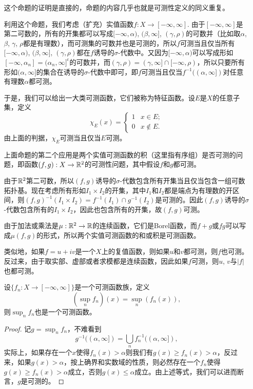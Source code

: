 这个命题的证明是直接的，命题的内容几乎也就是可测性定义的同义重复。

利用这个命题，我们考虑（扩充）实值函数$f:X\to [-\infty,\infty]$. 由于$[-\infty,\infty]$是第二可数的，所有的开集都可以写成$[-\infty,\alpha)$, $(\beta,\infty]$, $(\gamma,\rho)$的可数并（比如取$\alpha$, $\beta$, $\gamma$, $\rho$都是有理数），而可测集的可数并也是可测的，所以$f$可测当且仅当所有$[-\infty,\alpha)$, $(\beta,\infty]$, $(\gamma,\rho)$都在$f$诱导的$\sigma$-代数中。又因为$[-\infty,\alpha)$可以写成形如$[-\infty,\alpha_n]=(\alpha_n,\infty]^\text{c}$的可数并，而$(\gamma,\rho)=(\gamma,\infty]\cap [-\infty,\rho)$，所以只要所有形如$(\alpha,\infty]$的集合在诱导的$\sigma$-代数中即可，即$f$可测当且仅当$f^{-1}((\alpha,\infty])$对任意有理数$\alpha$都可测。

于是，我们可以给出一大类可测函数，它们被称为特征函数。设$E$是$X$的任意子集，定义
\[
	\chi_E(x)=\begin{cases}
	1&x\in E;\\
	0&x\not\in E.
	\end{cases}
\]
由上面的判据，$\chi_E$可测当且仅当$E$可测。

上面命题的第二个应用是两个实值可测函数的积（这里指有序组）是否可测的问题，即函数$(f,g):X\to \mathbb{R}^2$的可测性问题，其中假设$f$和$g$都可测。

由于$\mathbb{R}^2$第二可数，所以$(f,g)$诱导的$\sigma$-代数包含所有开集当且仅当包含一组可数拓扑基。现在考虑所有形如$I_1\times I_2$的开集，其中$I_1$和$I_2$都是端点为有理数的开区间，则$(f,g)^{-1}(I_1\times I_2)=f^{-1}(I_1)\cap g^{-1}(I_2)$是可测的。因此$(f,g)$诱导的$\sigma$-代数包含所有的$I_1\times I_2$，因此也包含所有的开集，故$(f,g)$可测。

由于加法或乘法是$\mu:\mathbb{R}^2\to \mathbb{R}$的连续函数，它们是Borel函数，而$f+g$或$fg$可以写成$\mu(f,g)$的形式，所以两个实值可测函数的和或积是可测函数。

类似地，如果$f=u+i v$是一个$X$上的复值函数，则如果$u$和$v$都可测，则$f$也可测。反过来，由于取实部、虚部或者求模都是连续函数，因此如果$f$可测，则$u$, $v$与$|f|$也都可测。

\begin{pro}
设$\{f_n:X\to [-\infty,\infty]\}$是一个可测函数族，定义
\[
	\left(\sup_n f_n\right)(x)=\sup_n (f_n(x)),
\]
则$\sup_n f_n$也是一个可测函数。
\end{pro}

\begin{proof}
记$g=\sup_n f_n$，不难看到
\[
	g^{-1}((\alpha,\infty])=\bigcup_n f_n^{-1}((\alpha,\infty]),
\]
实际上，如果存在一个$x$使得$f_n(x)>\alpha$则我们有$g(x)\geq f_n(x)>\alpha$，反过来，如果$g(x)>\alpha$，按上确界和实数域的性质，则必然存在一个$f_n$使得$g(x)\geq f_n(x)>\alpha$成立，否则$g(x)\leq \alpha$成立。由上述等式，我们可以进而断言，$g$是可测的。
\end{proof}

